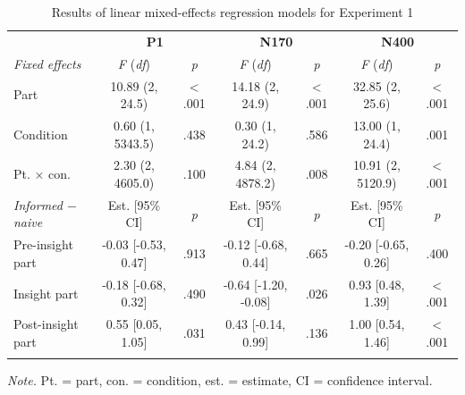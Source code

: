 \documentclass[
  english,
  doc,12pt,twoside,floatsintext]{apa7}
\begin{document}
\begin{table}[tbp]

\begin{center}
\begin{threeparttable}

\caption{\label{tab:exp1-table}Results of linear mixed-effects regression models for Experiment 1}

\footnotesize{

\begin{tabular}{lcccccc}
\toprule
 & \multicolumn{2}{c}{\textbf{P1}} & \multicolumn{2}{c}{\textbf{N170}} & \multicolumn{2}{c}{\textbf{N400}} \\
\cmidrule(r){2-3} \cmidrule(r){4-5} \cmidrule(r){6-7}
\textit{Fixed effects} & \textit{F} (\textit{df}) & \textit{p} & \textit{F} (\textit{df}) & \textit{p} & \textit{F} (\textit{df}) & \textit{p}\\
\midrule
Part & 10.89 (2, 24.5) & < .001 & 14.18 (2, 24.9) & < .001 & 32.85 (2, 25.6) & < .001\\
Condition & 0.60 (1, 5343.5) & .438 & 0.30 (1, 24.2) & .586 & 13.00 (1, 24.4) & .001\\
Pt. × con. & 2.30 (2, 4605.0) & .100 & 4.84 (2, 4878.2) & .008 & 10.91 (2, 5120.9) & < .001\\
\textit{Informed $-$  naive} & Est. [95\% CI] & \textit{p} & Est. [95\% CI] & \textit{p} & Est. [95\% CI] & \textit{p}\\ \midrule
Pre-insight part & -0.03 [-0.53, 0.47] & .913 & -0.12 [-0.68, 0.44] & .665 & -0.20 [-0.65, 0.26] & .400\\
Insight part & -0.18 [-0.68, 0.32] & .490 & -0.64 [-1.20, -0.08] & .026 & 0.93 [0.48, 1.39] & < .001\\
Post-insight part & 0.55 [0.05, 1.05] & .031 & 0.43 [-0.14, 0.99] & .136 & 1.00 [0.54, 1.46] & < .001\\
\bottomrule
\addlinespace
\end{tabular}

}

\begin{tablenotes}[para]
\normalsize{\textit{Note.} Pt. = part, con. = condition, est. = estimate, CI = confidence interval.}
\end{tablenotes}

\end{threeparttable}
\end{center}

\end{table}
\end{document}
